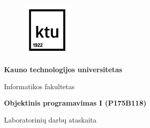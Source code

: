 \documentclass{article}
\begin{document}
\makeatletter
\renewcommand*\env@matrix[1][\arraystretch]{%
  \edef\arraystretch{#1}%
  \hskip -\arraycolsep
  \let\@ifnextchar\new@ifnextchar
  \array{*\c@MaxMatrixCols c}}
\makeatother

\makeatletter
\renewcommand\tableofcontents{%
  \null\hfill\textbf{\Large\contentsname}\hfill\null\par
  \@mkboth{\MakeUppercase\contentsname}{\MakeUppercase\contentsname}%
  \@starttoc{toc}%
}
\makeatother



\hypersetup{
    colorlinks=true,
    linkcolor=blue,
    filecolor=magenta,      
    urlcolor=cyan,
}

\begin{figure}[!ht]
    \centering
    \includegraphics[width=2.5cm]{Assets/ktu-ikona.png}
\end{figure}

\vspace{-0.8cm}

\begin{center}
    \Large\textbf{Kauno technologijos universitetas}
\end{center}

\vspace{-0.6cm}

\begin{center}
    \large{Informatikos fakultetas}
\end{center}

\vspace{5cm}

\begin{center}
    \LARGE\textbf{Objektinis programavimas I (P175B118)}
\end{center}

\vspace{-0.5cm}

\begin{center}
    \Large{Laboratorinių darbų ataskaita}
\end{center}
\end{document}
